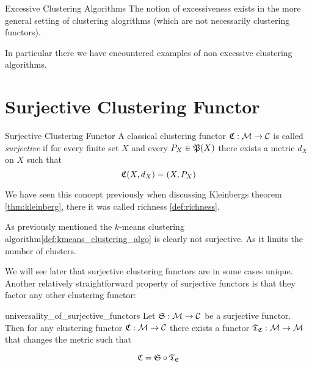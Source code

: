 \begin{myremark}{Excessive Clustering Algorithms}{}
The notion of excessiveness exists in the more general setting of clustering alogrithms (which are not necessarily clustering functors).
\end{myremark}

In particular there we have encountered examples of non excessive clustering algorithms.



\section{Surjective Clustering Functor}
\begin{definition}{Surjective Clustering Functor}{}
A classical clustering functor $\Cf: \M \to \C$ is called \emph{surjective} if for every finite set $X$ and every $P_X \in \P(X)$ there exists a metric $d_X$ on $X$ such that
\begin{equation*}
    \Cf(X,d_X) = (X,P_X)
\end{equation*}
\end{definition}

We have seen this concept previously when discussing Kleinbergs theorem \ref{thm:kleinberg}, there it was called richness \ref{def:richness}.

As previously mentioned the $k$-means clustering algorithm\ref{def:kmeans_clustering_algo} is clearly not surjective. As it limits the number of clusters.

We will see later that surjective clustering functors are in some cases unique. Another relatively straightforward property of surjective functors is that they factor any other clustering functor:

\begin{proposition}{}{universality_of_surjective_functors}
Let $\mathfrak{S}: \M \to \C$ be a surjective functor. Then for any clustering functor $\Cf: \M \to \C$ there exists a functor $\Tf_\Cf: \M \to \M$ that changes the metric such that

\begin{equation*}
\Cf = \mathfrak{S} \circ \Tf_\Cf
\end{equation*}
\end{proposition}

